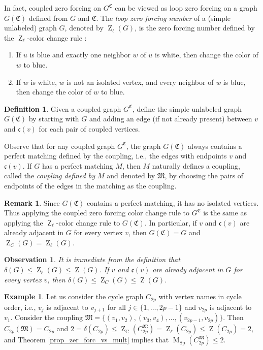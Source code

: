 \documentclass[12pt]{article}
\newtheorem{obs}[thm]{Observation}
\theoremstyle{definition}
\newtheorem{rem}[thm]{Remark}
\theoremstyle{definition}
\newtheorem{defn}[thm]{Definition}
\theoremstyle{definition}
\newtheorem{ex}[thm]{Example}
\numberwithin{figure}{section}
\numberwithin{equation}{section}
\newcommand{\GC}[2]{#1 ^ {\mathfrak #2}}
\newcommand{\PP}{\mathfrak{C}}
\newcommand{\pp}{\mathfrak{c}}
\newcommand{\MM}{\mathfrak{M}}
\newcommand{\Z}{\operatorname{Z}}
\newcommand{\ZC}{\Z_{\operatorname{C}}}
\newcommand{\Zell}{\Z_{\ell}}
\newcommand{\M}{\operatorname{M}}
\newcommand{\MC}{\M_{\operatorname{Sp}}}
\newcommand{\ben}{\begin{enumerate}}
\newcommand{\een}{\end{enumerate}}
\begin{document}
In fact, coupled zero forcing on $G^\PP$ can be viewed as loop zero forcing on a graph $G(\PP)$ defined from $G$ and $\PP$. The {\em  loop zero forcing number} of a (simple unlabeled) graph $G$,  denoted by $\Zell(G)$, is  the zero forcing number defined by the $\Zell$-color change rule \cite{param}:
\ben\item If $u$ is blue and exactly one  neighbor $w$ of $u$  is white, then change the color of $w$ to blue.  
\item If $w$ is white,  $w$ is not an isolated vertex, and every neighbor of $w$ is blue, then change the color of $w$ to blue.
\een


\begin{defn}
Given a coupled graph $\GC G C$, define the simple unlabeled graph $G(\PP)$ by starting with $G$  and  adding an edge (if not already present) between $v$ and $\pp(v)$ for each pair of coupled vertices. 
\end{defn}
  
Observe that for any coupled graph $\GC G C$, the graph $G(\PP)$ always contains a perfect matching defined by the coupling, i.e., the edges  with endpoints $v$ and $\pp(v)$.   If $G$ has a perfect matching $M$, then $M$ naturally defines a coupling, called the \emph{coupling defined by $M$} and denoted by $\MM$, by choosing the pairs of endpoints of the edges in the matching  as the coupling.

\begin{rem}\label{ZCZell} {Since  $G(\PP)$  contains a perfect matching, it}  has no isolated vertices. Thus applying the coupled zero forcing color change rule to $\GC G C$ is  the same as applying the $\Zell$-color change rule to $G(\PP).$
    In particular, if $v$ and $\pp(v)$ are already adjacent in $G$ for every vertex $v$, then $G(\PP)=G$ { and $\Z_{C}(G)=\Zell(G)$}. 
\end{rem}

\begin{obs}\label{obs-delta-Zell}
    It is immediate from the definition that $\delta(G)\le \Zell(G) {\le \Z(G)}$.  { If $v$ and $\pp(v)$ are already adjacent in $G$ for every vertex $v$, then  $\delta(G) \le  \Z_{C}(G)\le \Z(G)$.}
\end{obs}

\begin{ex} 
    Let us consider the  cycle graph $C_{2p}$  with vertex names  in cycle order, i.e., $v_j$ is adjacent to $v_{j+1}$ for all $j \in \{1,\ldots,2p-1\}$ and $v_{2p}$ is adjacent to $v_1$. 
    Consider the coupling ${ \MM}=\{(v_1,v_2),(v_3,v_4),\ldots,(v_{2p-1},v_{2p})\}$.  Then  $C_{2p}(\MM)= C_{2p}$ and $2=\delta(C_{2p})\le \ZC (C_{2p}^{\MM}) =\Zell(C_{2p})\le \Z(C_{2p})= 2$, 
    and Theorem \ref{prop_zer_forc_vs_mult} implies that $ \MC(C_{2p}^\MM) \leq 2$. 
\end{ex}
\end{document}
